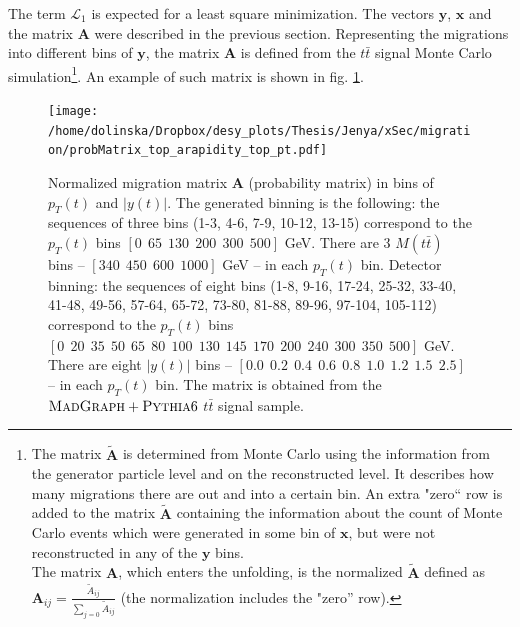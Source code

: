 The term $\mathcal{L}_{1}$ is expected for a least square minimization. The vectors $\mathbf{y}$, $\mathbf{x}$ and the matrix $\mathbf{A}$ were
described in the previous section. Representing the migrations into different bins of $\mathbf{y}$, the matrix $\mathbf{A}$
is defined from the $t\bar{t}$ signal Monte Carlo simulation\footnote{The matrix $\mathbf{\tilde{A}}$ is
determined from Monte Carlo using the information from the generator particle level and on the reconstructed level. It describes how many 
migrations there are out and into a certain bin. An extra "zero`` row is added
to the matrix $\mathbf{\tilde{A}}$ containing the information about the count of Monte Carlo events which were generated in some bin of $\mathbf{x}$,
but were not reconstructed in any of the $\mathbf{y}$ bins. \\ The matrix $\mathbf{A}$, which enters the unfolding, is the normalized $\mathbf{\tilde{A}}$
defined as $\mathbf{A}_{ij} = \frac{\tilde{A}_{ij}}{\sum_{j=0}\tilde{A}_{ij}}$ (the normalization includes the "zero'' row).}. An example of such matrix 
is shown in fig. \ref{fig:migMat}. 

\begin{figure}[p]
  \centering
  \texttt{[image: /home/dolinska/Dropbox/desy\_plots/Thesis/Jenya/xSec/migration/probMatrix\_top\_arapidity\_top\_pt.pdf]}
  \caption{Normalized migration matrix $\mathbf{A}$ (probability matrix) in bins of $p_{T}(t)$ and $|y(t)|$. The generated binning is the following:
          the sequences of three bins (1-3, 4-6, 7-9, 10-12, 13-15) correspond to the $p_{T}(t)$ bins $[0\:\:65\:\:130\:\:200\:\:300\:\:500]$ GeV.
          There are 3 $M(t\bar{t})$ bins -- $[340\:\:450\:\:600\:\:1000]$ GeV -- in each $p_{T}(t)$ bin.
          Detector binning:
          the sequences of eight bins (1-8, 9-16, 17-24, 25-32, 33-40, 41-48, 49-56, 57-64, 65-72, 73-80, 81-88, 89-96, 97-104, 105-112) correspond 
          to the $p_{T}(t)$ bins $[0\:\:20\:\:35\:\:50\:\:65\:\:80\:\:100\:\:130\:\:145\:\:170\:\:200\:\:240\:\:300\:\:350\:\:500]$ GeV.
          There are eight $|y(t)|$ bins -- $[0.0\:\:0.2\:\:0.4\:\:0.6\:\:0.8\:\:1.0\:\:1.2\:\:1.5\:\:2.5]$ -- in each $p_{T}(t)$ bin.
          The matrix is obtained from the $\textsc{MadGraph}+\textsc{Pythia}6$ $t\bar{t}$ signal sample.}
  \label{fig:migMat}
\end{figure}

